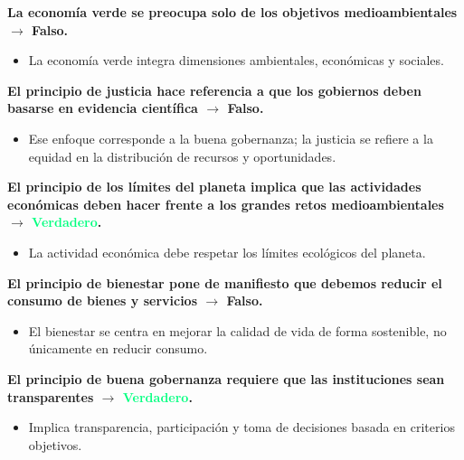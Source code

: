 
\begin{solution}

\textbf{La economía verde se preocupa solo de los objetivos medioambientales $\to$ \textcolor{samuraiRed}{\textbf{Falso}}.}
\begin{itemize}
    \item La economía verde integra dimensiones ambientales, económicas y sociales.
\end{itemize}

\textbf{El principio de justicia hace referencia a que los gobiernos deben basarse en evidencia científica $\to$ \textcolor{samuraiRed}{\textbf{Falso}}.}
\begin{itemize}
    \item Ese enfoque corresponde a la buena gobernanza; la justicia se refiere a la equidad en la distribución de recursos y oportunidades.
\end{itemize}

\textbf{El principio de los límites del planeta implica que las actividades económicas deben hacer frente a los grandes retos medioambientales $\to$ \textcolor{springGreen}{\textbf{Verdadero}}.}
\begin{itemize}
    \item La actividad económica debe respetar los límites ecológicos del planeta.
\end{itemize}

\textbf{El principio de bienestar pone de manifiesto que debemos reducir el consumo de bienes y servicios $\to$ \textcolor{samuraiRed}{\textbf{Falso}}.}
\begin{itemize}
    \item El bienestar se centra en mejorar la calidad de vida de forma sostenible, no únicamente en reducir consumo.
\end{itemize}

\textbf{El principio de buena gobernanza requiere que las instituciones sean transparentes $\to$ \textcolor{springGreen}{\textbf{Verdadero}}.}
\begin{itemize}
    \item Implica transparencia, participación y toma de decisiones basada en criterios objetivos.
\end{itemize}
\end{solution}
